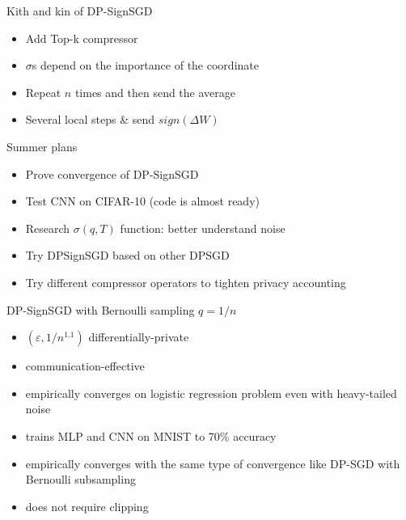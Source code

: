\documentclass{beamer}
\newcommand{\eps}{\varepsilon}
\begin{document}
\begin{frame}{Kith and kin of DP-SignSGD}
    \begin{itemize}
        \item Add Top-k compressor
        \item $\sigma$s depend on the importance of the coordinate
        \item Repeat $n$ times and then send the average
        \item Several local steps \& send $sign(\Delta W)$
    
    \end{itemize}
\end{frame}
\begin{frame}{Summer plans}
  \begin{itemize}
    \item Prove convergence of DP-SignSGD
    \item Test CNN on CIFAR-10 (code is almost ready)
    \item Research $\sigma(q, T)$ function: better understand noise
    \item Try DPSignSGD based on other DPSGD
    \item Try different compressor operators to tighten privacy accounting

  \end{itemize}
\end{frame}
\fi
\begin{frame}{DP-SignSGD with Bernoulli sampling $q = 1/n$}
    \begin{itemize}
        \item $(\eps, 1/n^{1.1})$ differentially-private
        \item communication-effective
        \item empirically converges on logistic regression problem even with heavy-tailed noise
        \item trains MLP and CNN on MNIST to 70\% accuracy
        \item empirically converges with the same type of convergence like DP-SGD with Bernoulli subsampling
        \item does not require clipping
    \end{itemize}
\end{frame}
\end{document}
